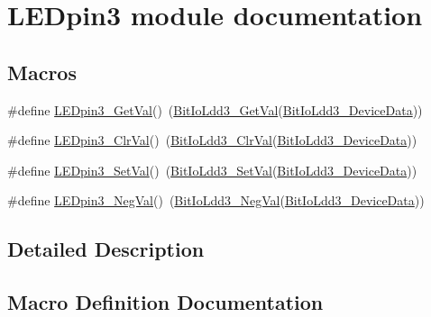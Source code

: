 \hypertarget{group___l_e_dpin3__module}{}\section{L\+E\+Dpin3 module documentation}
\label{group___l_e_dpin3__module}
\subsection*{Macros}
\begin{DoxyCompactItemize}
\item 
\#define \hyperlink{group___l_e_dpin3__module_gab6cfe66ad8b299ff936ff5030d9960d5}{L\+E\+Dpin3\+\_\+\+Get\+Val}()~(\hyperlink{group___bit_io_ldd3__module_gaf69704b3907d4685c381341b67daf0f2}{Bit\+Io\+Ldd3\+\_\+\+Get\+Val}(\hyperlink{group___bit_io_ldd3__module_ga6c42610f82c903df15f7a2a286e3dae4}{Bit\+Io\+Ldd3\+\_\+\+Device\+Data}))
\item 
\#define \hyperlink{group___l_e_dpin3__module_ga4a1dbfa4a99a042a095f0e4c9f192f52}{L\+E\+Dpin3\+\_\+\+Clr\+Val}()~(\hyperlink{group___bit_io_ldd3__module_gad1e5677bb374a68ea95ddac2e5b08503}{Bit\+Io\+Ldd3\+\_\+\+Clr\+Val}(\hyperlink{group___bit_io_ldd3__module_ga6c42610f82c903df15f7a2a286e3dae4}{Bit\+Io\+Ldd3\+\_\+\+Device\+Data}))
\item 
\#define \hyperlink{group___l_e_dpin3__module_ga87f26e16b11b83e9eb6b26b08bc276ad}{L\+E\+Dpin3\+\_\+\+Set\+Val}()~(\hyperlink{group___bit_io_ldd3__module_ga0db13c2a53c9dc14fa7f51701df5375c}{Bit\+Io\+Ldd3\+\_\+\+Set\+Val}(\hyperlink{group___bit_io_ldd3__module_ga6c42610f82c903df15f7a2a286e3dae4}{Bit\+Io\+Ldd3\+\_\+\+Device\+Data}))
\item 
\#define \hyperlink{group___l_e_dpin3__module_ga7b7480d673eb2347ba54b6d7c93313aa}{L\+E\+Dpin3\+\_\+\+Neg\+Val}()~(\hyperlink{group___bit_io_ldd3__module_gaf2f93fab1bcb91f83a96805a4cdec84e}{Bit\+Io\+Ldd3\+\_\+\+Neg\+Val}(\hyperlink{group___bit_io_ldd3__module_ga6c42610f82c903df15f7a2a286e3dae4}{Bit\+Io\+Ldd3\+\_\+\+Device\+Data}))
\end{DoxyCompactItemize}


\subsection{Detailed Description}


\subsection{Macro Definition Documentation}
\mbox{\label{group___l_e_dpin3__module_ga4a1dbfa4a99a042a095f0e4c9f192f52}} 
